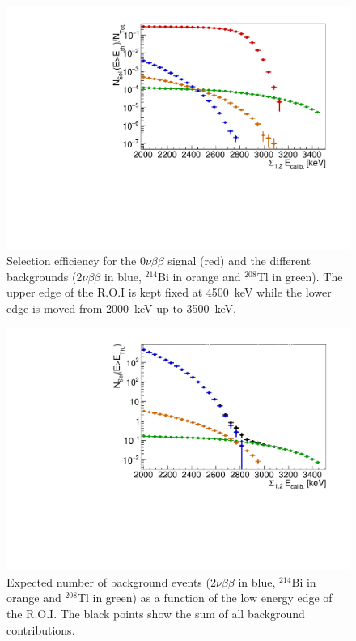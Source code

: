 \documentclass[main.tex]{subfiles}
\begin{document}
\begin{figure}[h!]
\centering
\includegraphics[scale=0.6]{pictures/Chap4/EffExample.pdf}
\caption{Selection efficiency for the 0$\nu\beta\beta$ signal (red) and the different backgrounds (2$\nu\beta\beta$ in blue, $^{\text{214}}$Bi in orange and $^{\text{208}}$Tl in green). The upper edge of the R.O.I is kept fixed at 4500~keV while the lower edge is moved from 2000~keV up to 3500~keV.}
\label{SelectionEfficiency}
\end{figure}


\begin{figure}[h!]
\centering
\includegraphics[scale=0.6]{pictures/Chap4/BkgExample.pdf}

\caption{Expected number of background events (2$\nu\beta\beta$ in blue, $^{\text{214}}$Bi in orange and $^{\text{208}}$Tl in green) as a function of the low energy edge of the R.O.I. The black points show the sum of all background contributions.}
\label{ExpectedNumberofEvent}
\end{figure}
\end{document}

